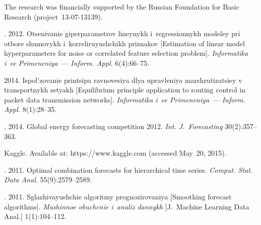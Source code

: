 


\Ack
\noindent
The research was financially supported by the Russian Foundation for
Basic Research (project~13-07-13139).




  \begin{multicols}{2}

\renewcommand{\bibname}{\protect\rmfamily References}



{\small\frenchspacing
 {%
 \begin{thebibliography}{99}

.
2012. Otsenivanie giperparametrov lineynykh i~regressionnykh
    modeley pri otbore shumovykh i~korreliruyushchikh priznakov [Estimation of linear model
    hyperparameters for noise or correlated feature selection problem].
    \textit{Informatika i~ee Primeneniya}~--- \textit{Inform. Appl.} 6(4):66--75.


     2014. Ispol'zovanie printsipa ravnovesiya dlya upravleniya marshrutizatsiey v
    transportnykh setyakh
    [Equilibrium principle application to routing control in packet
    data transmission networks]. \textit{Informatika i~ee Primeneniya}~---
    \textit{Inform. Appl.} 8(1):28--35.

.
2014. Global energy forecasting competition 2012.  \textit{Int.
    J.~Forecasting} 30(2):357--363.

    Kaggle. Available at: {\sf https://www.kaggle.com} (accessed May~20, 2015).

.
2011. Optimal
    combination forecasts for hierarchical time series. \textit{Comput.
    Stat. Data Anal}. 55(9):2579--2589.

. 2011. Sglazhivayushchie algoritmy prognozirovaniya
[Smoothing forecast algorithms]. \textit{Mashinnoe obuchenie i~analiz dannykh}
[J.~Machine Learning Data Anal.] 1(1):104--112.


\end{thebibliography}}}
\end{multicols}
